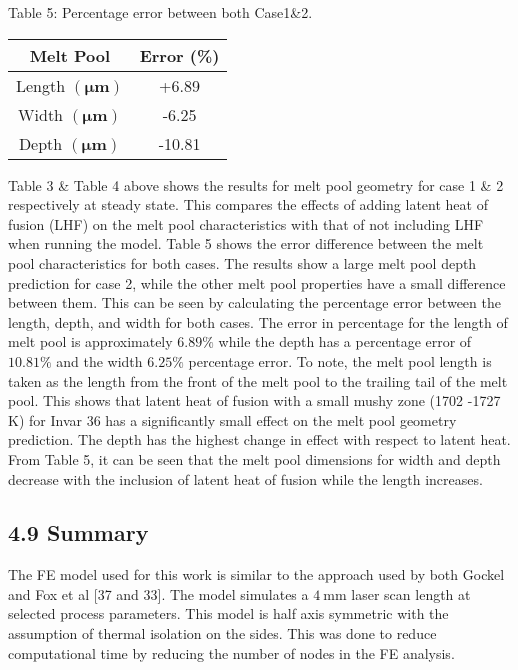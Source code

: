 \documentclass[10pt]{article}
\begin{document}
Table 5: Percentage error between both Case1\&2.

\begin{center}
\begin{tabular}{c|c}
\hline
Melt Pool & Error (\%) \\
\hline
Length $(\boldsymbol{\mu m})$ & +6.89 \\
\hline
Width $(\boldsymbol{\mu m})$ & -6.25 \\
\hline
Depth $(\boldsymbol{\mu m})$ & -10.81 \\
\hline
\end{tabular}
\end{center}

Table 3 \& Table 4 above shows the results for melt pool geometry for case 1 \& 2 respectively at steady state. This compares the effects of adding latent heat of fusion (LHF) on the melt pool characteristics with that of not including LHF when running the model. Table 5 shows the error difference between the melt pool characteristics for both cases. The results show a large melt pool depth prediction for case 2, while the other melt pool properties have a small difference between them. This can be seen by calculating the percentage error between the length, depth, and width for both cases. The error in percentage for the length of melt pool is approximately $6.89 \%$ while the depth has a percentage error of $10.81 \%$ and the width $6.25 \%$ percentage error. To note, the melt pool length is taken as the length from the front of the melt pool to the trailing tail of the melt pool. This shows that latent heat of fusion with a small mushy zone (1702 -1727 K) for Invar 36 has a significantly small effect on the melt pool geometry prediction. The depth has the highest change in effect with respect to latent heat. From Table 5, it can be seen that the melt pool dimensions for width and depth decrease with the inclusion of latent heat of fusion while the length increases.

\subsection*{4.9 Summary}
The FE model used for this work is similar to the approach used by both Gockel and Fox et al [37 and 33]. The model simulates a $4 \mathrm{~mm}$ laser scan length at selected process parameters. This model is half axis symmetric with the assumption of thermal isolation on the sides. This was done to reduce computational time by reducing the number of nodes in the FE analysis.
\end{document}
